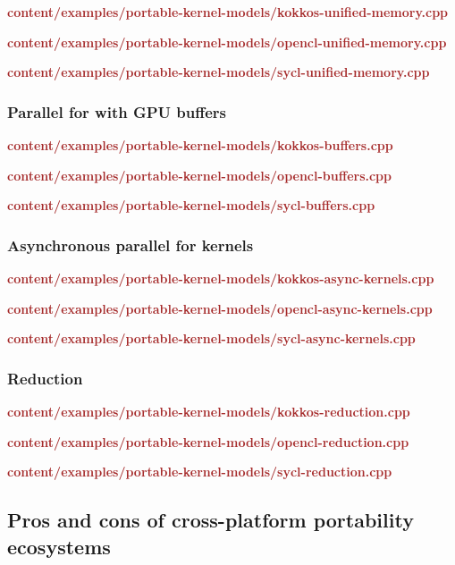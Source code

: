 \textbf{\textcolor{brown}{content/examples/portable-kernel-models/kokkos-unified-memory.cpp}}

\textbf{\textcolor{brown}{content/examples/portable-kernel-models/opencl-unified-memory.cpp}}

\textbf{\textcolor{brown}{content/examples/portable-kernel-models/sycl-unified-memory.cpp}}


\subsubsection{Parallel for with GPU buffers}

\textbf{\textcolor{brown}{content/examples/portable-kernel-models/kokkos-buffers.cpp}}

\textbf{\textcolor{brown}{content/examples/portable-kernel-models/opencl-buffers.cpp}}

\textbf{\textcolor{brown}{content/examples/portable-kernel-models/sycl-buffers.cpp}}



\subsubsection{Asynchronous parallel for kernels}


\textbf{\textcolor{brown}{content/examples/portable-kernel-models/kokkos-async-kernels.cpp}}

\textbf{\textcolor{brown}{content/examples/portable-kernel-models/opencl-async-kernels.cpp}}

\textbf{\textcolor{brown}{content/examples/portable-kernel-models/sycl-async-kernels.cpp}}


\subsubsection{Reduction}


\textbf{\textcolor{brown}{content/examples/portable-kernel-models/kokkos-reduction.cpp}}

\textbf{\textcolor{brown}{content/examples/portable-kernel-models/opencl-reduction.cpp}}

\textbf{\textcolor{brown}{content/examples/portable-kernel-models/sycl-reduction.cpp}}




\subsection{Pros and cons of cross-platform portability ecosystems}

